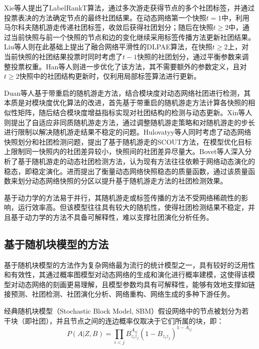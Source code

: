 Xie等人\cite{xie2013labelrankt}提出了LabelRankT算法，通过多次游走获得节点的多个社团标签，并通过投票表决的方法确定节点的最终社团结果。在动态网络第一个快照$t=1$中，利用马尔科夫随机游走传递社团标签，收敛后获得社团划分；随后在快照$t \ge 2$中，通过当前快照与前一个快照的节点和边的变化继续采用标签传播方法更新社团结果。Liu等人\cite{liu2015label}则在此基础上提出了融合网络平滑性的DLPAE算法，在快照$t \ge 2$上，对当前快照的社团结果投票时同时考虑了$t-1$快照的社团划分，通过平衡参数来调整投票权重。Han等人\cite{han2017community}则进一步优化了该方法，其不需要额外的参数定义，且对$t \ge 2$快照中的社团结构更新时，仅利用局部标签算法进行更新。

Duan等人\cite{duan2009community}基于带重启的随机游走方法，结合模块度对动态网络社团进行检测，其本质是对模块度优化算法的改进，首先基于带重启的随机游走方法计算各快照的相似性矩阵，随后结合模块度增益指标实现对社团结构的检测与动态更新。Xin等人\cite{xin2016adaptive}则提出了自适应非同质随机游走方法，通过调整随机游走策略和对随机游走的步长进行限制以解决随机游走结果不稳定的问题。Hulovatyy等人\cite{hulovatyy2016scout}同时考虑了动态网络快照划分和社团检测问题，提出了基于随机游走的SCOUT方法，在模型优化目标上限制同一快照内的社团差异较小，快照间的社团差异尽量大。Bovet等人\cite{doi:10.1126/sciadv.abj3063}深入分析了基于随机游走的动态社团检测方法，认为现有方法往往依赖于网络动态演化的稳态，即稳定演化。进而提出了衡量动态网络快照稳态的质量函数，通过该质量函数来划分动态网络快照的分区以提升基于随机游走方法的社团检测效果。

基于动力学的方法易于并行，其随机游走或标签传播的方法不受网络稀疏性的影响，运行效率高。但该模型往往具有较大的随机性，使得社团检测结果不稳定，并且基于动力学的方法不具备可解释性，难以支撑社团演化分析任务。

\subsection{基于随机块模型的方法}

基于随机块模型的方法作为复杂网络最为流行的统计模型之一\cite{karrer2011stochastic}，具有较好的泛用性和有效性，其通过概率图模型对动态网络的生成和演化进行概率建模，这使得该模型对动态网络的刻画更易理解，且模型参数均具有可解释性，能够有效地支撑如链接预测、社团检测、社团演化分析、网络重构、网络生成的多种下游任务。

经典随机块模型（Stochastic Block Model, SBM）假设网络中的节点被划分为若干块（即社团），并且节点之间的连边概率仅取决于它们所属的块，即：
\[
P(A | Z, B) = \prod_{i < j} B_{z_i z_j}^{A_{ij}} (1 - B_{z_i z_j})^{1 - A_{ij}}
\]

